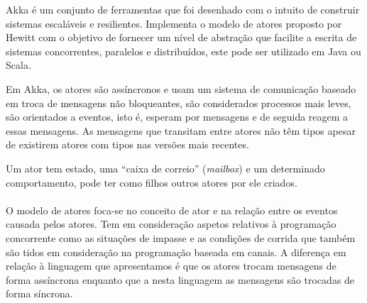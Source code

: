Akka é um conjunto de ferramentas que foi desenhado com o intuito de construir sistemas escaláveis e resilientes.
Implementa o modelo de atores proposto por Hewitt  \cite{Hewitt:ActorFormalismForAI} com o objetivo de fornecer um nível de abstração que facilite a escrita de sistemas concorrentes, paralelos e distribuídos, este pode ser utilizado em Java ou Scala.

Em Akka, os atores são assíncronos e usam um sistema de comunicação baseado em troca de mensagens não bloqueantes, são considerados processos mais leves, são orientados a eventos, isto é, esperam por mensagens e de seguida reagem a essas mensagens. As mensagens que transitam entre atores não têm tipos apesar de existirem atores com tipos nas versões mais recentes.

Um ator tem estado, uma ``caixa de correio'' (\textit{mailbox}) e um determinado comportamento, pode ter como filhos outros atores por ele criados. %

\paragraph{}O modelo de atores foca-se no conceito de ator e na relação entre os eventos causada pelos atores. Tem em consideração aspetos relativos à programação concorrente como as situações de impasse e as condições de corrida que também são tidos em consideração na programação baseada em canais. A diferença em relação à linguagem que apresentamos é que os atores trocam mensagens de forma assíncrona enquanto que a nesta linguagem as mensagens são trocadas de forma síncrona.


